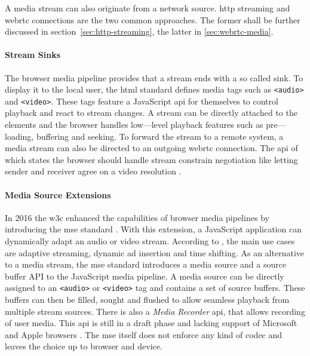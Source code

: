 A media stream can also originate from a network source. \Gls{http} streaming and \gls{webrtc} connections are the two common approaches. The former shall be further discussed in section~\ref{sec:http-streaming}, the latter in \vref{sec:webrtc-media}.

\paragraph{Stream Sinks}

The browser media pipeline provides that a stream ends with a so called sink. To display it to the local user, the \gls{html} standard \cite[\S4.7]{html-w3c} defines media tags such as \lstinline|<audio>| and \lstinline|<video>|. These tags feature a JavaScript \gls{api} for themselves to control playback and react to stream changes. A stream can be directly attached to the elements and the browser handles low—level playback features such as pre—loading, buffering and seeking. To forward the stream to a remote system, a media stream can also be directed to an outgoing \gls{webrtc} connection. The \gls{api} of which states the browser should handle stream constrain negotiation like letting sender and receiver agree on a video resolution \cite[\S5.1]{webrtc-w3c}.

\paragraph{Media Source Extensions}\label{par:browser-media-mse}

In 2016 the \gls{w3c} enhanced the capabilities of browser media pipelines by introducing the \gls{mse} standard \cite{media-source-extensions}. With this extension, a JavaScript application can dynamically adapt an audio or video stream. According to \cite{mse-google}, the main use cases are adaptive streaming, dynamic ad insertion and time shifting. As an alternative to a media stream, the \gls{mse} standard introduces a media source and a source buffer API to the JavaScript media pipeline. A media source can be directly assigned to an \lstinline|<audio>| or \lstinline|<video>| tag and contains a set of source buffers. These buffers can then be filled, sought and flushed to allow seamless playback from multiple stream sources. There is also a \textit{Media Recorder} \gls{api}, that allows recording of user media. This \gls{api} is still in a draft phase and lacking support of Microsoft and Apple browsers \cite{media-recorder}. The \gls{mse} itself does not enforce any kind of codec and leaves the choice up to browser and device.

